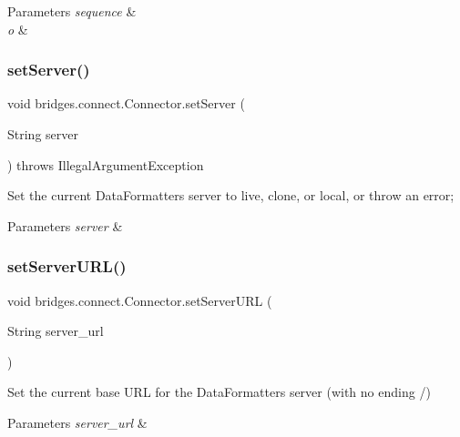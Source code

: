 \begin{DoxyParams}{Parameters}
{\em sequence} & \\
\hline
{\em o} & \\
\hline
\end{DoxyParams}
\mbox{\label{classbridges_1_1connect_1_1_connector_acab24a8c4ffd3349ec67536552fb30b3}} 
\subsubsection{\texorpdfstring{set\+Server()}{setServer()}}
{\footnotesize\ttfamily void bridges.\+connect.\+Connector.\+set\+Server (\begin{DoxyParamCaption}\item[{String}]{server }\end{DoxyParamCaption}) throws Illegal\+Argument\+Exception}

Set the current Data\+Formatters server to live, clone, or local, or throw an error; 
\begin{DoxyParams}{Parameters}
{\em server} & \\
\hline
\end{DoxyParams}
\mbox{\label{classbridges_1_1connect_1_1_connector_a71f449c91e529f79730df27e01fdf674}} 
\subsubsection{\texorpdfstring{set\+Server\+U\+R\+L()}{setServerURL()}}
{\footnotesize\ttfamily void bridges.\+connect.\+Connector.\+set\+Server\+U\+RL (\begin{DoxyParamCaption}\item[{String}]{server\+\_\+url }\end{DoxyParamCaption})}

Set the current base U\+RL for the Data\+Formatters server (with no ending /) 
\begin{DoxyParams}{Parameters}
{\em server\+\_\+url} & \\
\hline
\end{DoxyParams}
\mbox{\label{classbridges_1_1connect_1_1_connector_ac0dca0bd99b6abbbd8a77874a95e6d49}} 
